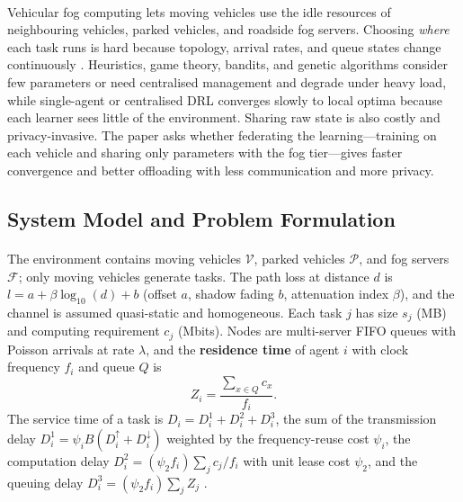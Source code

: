 \documentclass[12pt,a4paper,final]{extreport}
\begin{document}
\paragraph{} Vehicular fog computing lets moving vehicles use the idle resources of neighbouring vehicles, parked vehicles, and roadside fog servers. Choosing \emph{where} each task runs is hard because topology, arrival rates, and queue states change continuously \cite{p1}. Heuristics, game theory, bandits, and genetic algorithms consider few parameters or need centralised management and degrade under heavy load, while single-agent or centralised DRL converges slowly to local optima because each learner sees little of the environment. Sharing raw state is also costly and privacy-invasive. The paper asks whether federating the learning---training on each vehicle and sharing only parameters with the fog tier---gives faster convergence and better offloading with less communication and more privacy.

\subsection{System Model and Problem Formulation}

\paragraph{} The environment contains moving vehicles $\mathcal{V}$, parked vehicles $\mathcal{P}$, and fog servers $\mathcal{F}$; only moving vehicles generate tasks. The path loss at distance $d$ is $l=a+\beta\log_{10}(d)+b$ (offset $a$, shadow fading $b$, attenuation index $\beta$), and the channel is assumed quasi-static and homogeneous. Each task $j$ has size $s_j$ (MB) and computing requirement $c_j$ (Mbits). Nodes are multi-server FIFO queues with Poisson arrivals at rate $\lambda$, and the \textbf{residence time} of agent $i$ with clock frequency $f_i$ and queue $Q$ is
\begin{equation}
Z_i=\frac{\sum_{x\in Q}c_x}{f_i}.
\end{equation}
The service time of a task is $D_i=D^{1}_i+D^{2}_i+D^{3}_i$, the sum of the transmission delay $D^{1}_i=\psi_iB(D^{\uparrow}_i+D^{\downarrow}_i)$ weighted by the frequency-reuse cost $\psi_i$, the computation delay $D^{2}_i=(\psi_2f_i)\sum_jc_j/f_i$ with unit lease cost $\psi_2$, and the queuing delay $D^{3}_i=(\psi_2f_i)\sum_jZ_j$ \cite{p1}.
\end{document}
